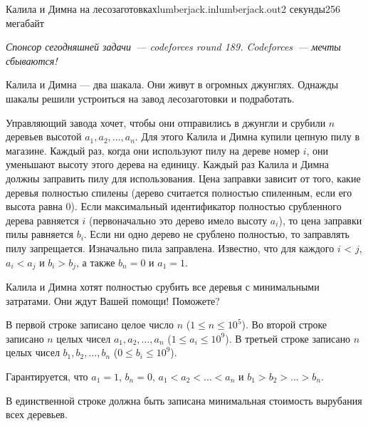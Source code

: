 \begin{problem}{Калила и Димна на лесозаготовках}{lumberjack.in}{lumberjack.out}{2 секунды}{256 мегабайт}

\begin{flushright}
{\it Спонсор сегодняшней задачи~--- codeforces round 189. Codeforces~--- мечты сбываются! }
\end{flushright}

Калила и Димна --- два шакала. Они живут в огромных джунглях. Однажды шакалы решили устроиться на завод лесозаготовки и подработать. 

Управляющий завода хочет, чтобы они отправились в джунгли и срубили $n$ деревьев высотой $a_1, a_2, \dots, a_n$. Для этого Калила и Димна купили цепную пилу в магазине. Каждый раз, когда они используют пилу на дереве номер $i$, они уменьшают высоту этого дерева на единицу. Каждый раз Калила и Димна должны заправить пилу для использования. Цена заправки зависит от того, какие деревья полностью спилены (дерево считается полностью спиленным, если его высота равна 0). Если максимальный идентификатор полностью срубленного дерева равняется $i$ (первоначально это дерево имело высоту $a_i$), то цена заправки пилы равняется $b_i$. Если ни одно дерево не срублено полностью, то заправлять пилу запрещается. Изначально пила заправлена. Известно, что для каждого $i$ < $j$, $a_i < a_j$ и $b_i > b_j$, а также $b_n = 0$ и $a_1 = 1$. 

Калила и Димна хотят полностью срубить все деревья с минимальными затратами. Они ждут Вашей помощи! Поможете?

\InputFile
В первой строке записано целое число $n$ ($1 \le n \le 10^5$).
Во второй строке записано $n$ целых чисел $a_1, a_2, \dots, a_n$ ($1 \le a_i \le 10^9$).
В третьей строке записано $n$ целых чисел $b_1, b_2, \dots, b_n$ ($0 \le b_i \le 10^9$).

Гарантируется, что $a_1 = 1$, $b_n = 0$, $a_1 < a_2 < \dots < a_n$ и $b_1 > b_2 > \dots > b_n$.

\OutputFile
В единственной строке должна быть записана минимальная стоимость вырубания всех деревьев.

\Examples

\begin{example}
%
%
\end{example}

\end{problem}
